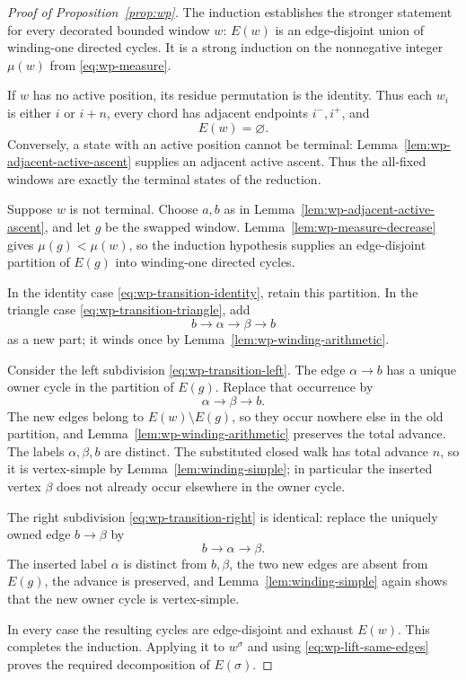 \documentclass[11pt]{article}
\theoremstyle{definition}
\begin{document}
\begin{proof}[Proof of Proposition~\ref{prop:wp}]
The induction establishes the stronger statement for every decorated bounded
window \(w\): \(E(w)\) is an edge-disjoint union of winding-one directed
cycles. It is a strong induction on the nonnegative integer \(\mu(w)\) from
\eqref{eq:wp-measure}.

If \(w\) has no active position, its residue permutation is the identity.
Thus each \(w_i\) is either \(i\) or \(i+n\), every chord has adjacent
endpoints \(i^-,i^+\), and
\[
   E(w)=\varnothing.
\]
Conversely, a state with an active position cannot be terminal:
Lemma~\ref{lem:wp-adjacent-active-ascent} supplies an adjacent active ascent.
Thus the all-fixed windows are exactly the terminal states of the reduction.

Suppose \(w\) is not terminal. Choose \(a,b\) as in
Lemma~\ref{lem:wp-adjacent-active-ascent}, and let \(g\) be the swapped
window. Lemma~\ref{lem:wp-measure-decrease} gives \(\mu(g)<\mu(w)\), so the
induction hypothesis supplies an edge-disjoint partition of \(E(g)\) into
winding-one directed cycles.

In the identity case \eqref{eq:wp-transition-identity}, retain this partition.
In the triangle case \eqref{eq:wp-transition-triangle}, add
\[
   b\to\alpha\to\beta\to b
\]
as a new part; it winds once by Lemma~\ref{lem:wp-winding-arithmetic}.

Consider the left subdivision \eqref{eq:wp-transition-left}. The edge
\(\alpha\to b\) has a unique owner cycle in the partition of \(E(g)\).
Replace that occurrence by
\[
   \alpha\to\beta\to b.
\]
The new edges belong to \(E(w)\setminus E(g)\), so they occur nowhere else in
the old partition, and Lemma~\ref{lem:wp-winding-arithmetic} preserves the
total advance. The labels \(\alpha,\beta,b\) are distinct. The substituted
closed walk has total advance \(n\), so it is vertex-simple by
Lemma~\ref{lem:winding-simple}; in particular the inserted vertex \(\beta\)
does not already occur elsewhere in the owner cycle.

The right subdivision \eqref{eq:wp-transition-right} is identical: replace
the uniquely owned edge \(b\to\beta\) by
\[
   b\to\alpha\to\beta.
\]
The inserted label \(\alpha\) is distinct from \(b,\beta\), the two new edges
are absent from \(E(g)\), the advance is preserved, and
Lemma~\ref{lem:winding-simple} again shows that the new owner cycle is
vertex-simple.

In every case the resulting cycles are edge-disjoint and exhaust \(E(w)\).
This completes the induction. Applying it to \(w^\sigma\) and using
\eqref{eq:wp-lift-same-edges} proves the required decomposition of
\(E(\sigma)\).


\end{proof}
\end{document}
